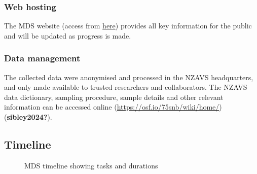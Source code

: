 \documentclass[
]{interact}
\begin{document}
\subsubsection{Web hosting}\label{web-hosting}

The MDS website (access from
\href{https://linktr.ee/muslimdiversity}{here}) provides all key
information for the public and will be updated as progress is made.

\subsubsection{Data management}\label{data-management}

The collected data were anonymised and processed in the NZAVS
headquarters, and only made available to trusted researchers and
collaborators. The NZAVS data dictionary, sampling procedure, sample
details and other relevant information can be accessed online
(\url{https://osf.io/75snb/wiki/home/}) (\textbf{sibley2024?}).

\subsection{Timeline}\label{timeline}

\begin{figure}


\caption{\label{fig-timeline}MDS timeline showing tasks and durations}

\end{figure}%
\end{document}
